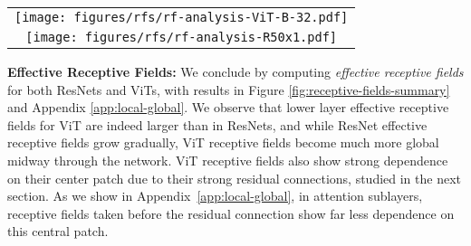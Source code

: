 \documentclass{article}
\begin{document}
\begin{SCfigure}[50]
    \centering
    \hspace{-1.5em}
    \begin{tabular}{c}
    \texttt{[image: figures/rfs/rf-analysis-ViT-B-32.pdf]}\\
    \texttt{[image: figures/rfs/rf-analysis-R50x1.pdf]}
    \end{tabular}
    \hspace{-1.0em}
    \caption{\small \textbf{ResNet effective receptive fields are highly local and grow gradually; ViT effective receptive fields shift from local to global}. We measure the effective receptive field of different layers as the absolute value of the gradient of the center location of the feature map (taken after residual connections) with respect to the input. %
    Results are averaged across all channels in each map for 32 randomly-selected images.
    }
    \label{fig:receptive-fields-summary}
\end{SCfigure}

\textbf{Effective Receptive Fields:}
We conclude by computing \textit{effective receptive fields} \cite{luo2017understanding} for both ResNets and ViTs, with results in Figure \ref{fig:receptive-fields-summary} and Appendix \ref{app:local-global}. We observe that lower layer effective receptive fields for ViT are indeed larger than in ResNets, and while ResNet effective receptive fields grow gradually, ViT receptive fields become much more global midway through the network. ViT receptive fields also show strong dependence on their center patch due to their strong residual connections, studied in the next section. As we show in Appendix~\ref{app:local-global}, in attention sublayers, receptive fields taken before the residual connection show far less dependence on this central patch.

\end{document}

